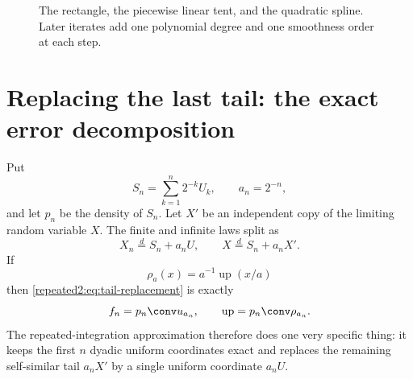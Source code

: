 \documentclass[11pt,oneside]{article}
\theoremstyle{definition}
\theoremstyle{remark}
\newcommand{\Up}{\operatorname{up}}
\begin{document}
\begin{figure}[htbp]
\centering
{}
\caption{The rectangle, the piecewise linear tent, and the quadratic spline.  Later
iterates add one polynomial degree and one smoothness order at each step.}
\label{repeated2:fig:first-iterates}
\end{figure}

\section{Replacing the last tail: the exact error decomposition}
\label{repeated2:sec:error-decomposition}

Put
\begin{equation}
 S_n=\sum_{k=1}^{n}2^{-k}U_k,
 \qquad a_n=2^{-n},
 \label{repeated2:eq:Sn-an}
\end{equation}
and let $p_n$ be the density of $S_n$.  Let $X'$ be an independent copy of the limiting
random variable $X$.  The finite and infinite laws split as
\begin{equation}
 X_n\stackrel d=S_n+a_nU,
 \qquad
 X\stackrel d=S_n+a_nX'.
 \label{repeated2:eq:tail-replacement}
\end{equation}
If
\begin{equation}
 \rho_a(x)=a^{-1}\Up(x/a)
 \label{repeated2:eq:scaled-up-density}
\end{equation}
then \eqref{repeated2:eq:tail-replacement} is exactly
\begin{equation}
 f_n=p_n\conv u_{a_n},
 \qquad
 \Up=p_n\conv\rho_{a_n}.
 \label{repeated2:eq:finite-infinite-convolution-split}
\end{equation}
The repeated-integration approximation therefore does one very specific thing: it keeps the
first $n$ dyadic uniform coordinates exact and replaces the remaining self-similar tail
$a_nX'$ by a single uniform coordinate $a_nU$.
\end{document}

